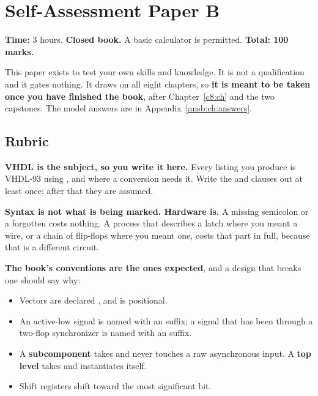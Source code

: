 
\chapter{Self-Assessment Paper B}
\label{exb:ch:paper}

\noindent\textbf{Time:} 3 hours. \textbf{Closed book.} A basic calculator is permitted.
\textbf{Total: 100 marks.}

This paper exists to test your own skills and knowledge. It is not a qualification and it gates
nothing. It draws on all eight chapters, so \textbf{it is meant to be taken once you have finished
the book}, after Chapter~\ref{c8:ch} and the two capstones. The model answers are in
Appendix~\ref{ansb:ch:answers}.

\section*{Rubric}
\textbf{VHDL is the subject, so you write it here.} Every listing you produce is VHDL-93 using
, and  where a conversion needs it. Write the
 and  clauses out at least once; after that they are assumed.

\textbf{Syntax is not what is being marked. Hardware is.} A missing semicolon or a forgotten
 costs nothing. A process that describes a latch where you meant a wire, or a chain of
flip-flops where you meant one, costs that part in full, because that is a different circuit.

\textbf{The book's conventions are the ones expected}, and a design that breaks one should say why:
\begin{itemize}
  \item Vectors are declared , and  is positional.
  \item An active-low signal is named with an  suffix; a signal that has been through a
    two-flop synchronizer is named with an  suffix.
  \item A \textbf{subcomponent} takes  and never touches a raw asynchronous input.
    A \textbf{top level} takes  and instantiates  itself.
  \item Shift registers shift toward the most significant bit.
\end{itemize}

